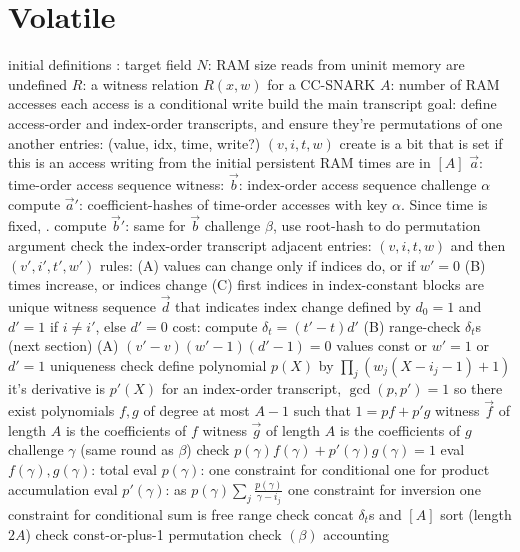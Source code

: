 \section{Volatile}
\begin{outline}
\1 initial definitions
  \2 \FF: target field
  \2 $N$: RAM size
  \2 reads from uninit memory are undefined
  \2 $R$: a witness relation $R(x, w)$ for a CC-SNARK
    \3 $A$: number of RAM accesses
      \4 each access is a conditional write
\1 build the main transcript
  \2 goal: define access-order and index-order transcripts, and ensure they're
  permutations of one another
  \2 entries: (value, idx, time, write?) $(v, i, t, w)$
    \3 create is a bit that is set if this is an access writing from the initial persistent RAM
    \3 times are in $[A]$
  \2 $\vec a$: time-order access sequence
  \2 witness: $\vec b$: index-order access sequence
  \2 challenge $\alpha$
  \2 compute $\vec a'$: coefficient-hashes of time-order accesses with key
  $\alpha$.
    \3 Since time is fixed, .
  \2 compute $\vec b'$: same for $\vec b$
    \3 
  \2 challenge $\beta$, use root-hash to do permutation argument
    \3 
\1 check the index-order transcript
  \2 adjacent entries: $(v, i, t, w)$ and then $(v', i', t', w')$
  \2 rules:
    \3 (A) values can change only if indices do, or if $w'=0$
    \3 (B) times increase, or indices change
    \3 (C) first indices in index-constant blocks are unique
  \2 witness sequence $\vec d$ that indicates index change
    \3 defined by $d_0=1$ and $d'=1$ if $i \ne i'$, else $d'=0$
    \3 cost: 
  \2 compute $\delta_t = (t'-t)d'$ 
  \2 (B) range-check $\delta_t$s (next section)
  \2 (A) $(v'-v)(w'-1)(d'-1)=0$
    \3 
    \3 values const or $w'=1$ or $d'=1$
\1 uniqueness check
  \2 define polynomial $p(X)$ by $\prod_j (w_j(X - i_j - 1) + 1)$
  \2 it's derivative is $p'(X)$
  \2 for an index-order transcript, $\gcd(p,p')=1$
    \3 so there exist polynomials $f,g$ of degree at most $A-1$ such that $1 = pf + p'g$
  \2 witness $\vec f$ of length $A$ is the coefficients of $f$
  \2 witness $\vec g$ of length $A$ is the coefficients of $g$
  \2 challenge $\gamma$ (same round as $\beta$)
  \2 check $p(\gamma)f(\gamma) + p'(\gamma)g(\gamma)=1$
  \2 eval $f(\gamma), g(\gamma)$:  total
  \2 eval $p(\gamma)$: 
    \3 one constraint for conditional
    \3 one for product accumulation
  \2 eval $p'(\gamma)$: 
    \3 as $p(\gamma)\sum_j\frac{p(\gamma)}{\gamma-i_j}$
    \3 one constraint for inversion
    \3 one constraint for conditional
    \3 sum is free
\1 range check
  \2 concat $\delta_t$s and $[A]$
  \2 sort (length $2A$)
  \2 check const-or-plus-1 
  \2 permutation check $(\beta)$ 
\1 accounting
  \2 
\end{outline}

